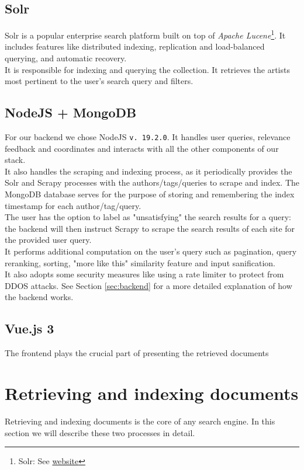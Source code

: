 \documentclass[tikz,14pt]{article}
\begin{document}
\subsection{Solr} \label{sec:solr}
Solr is a popular enterprise search platform built on top of \textit{Apache Lucene}\footnote{Solr: See \href{https://solr.apache.org/guide/solr/9_0/index.html}{website}}. It includes features like distributed indexing, replication and load-balanced querying, and automatic recovery.\\
It is responsible for indexing and querying the collection. It retrieves the artists most pertinent to the user's search query and filters.

\subsection{NodeJS + MongoDB} \label{sec:node-mongo}
For our backend we chose NodeJS \verb|v. 19.2.0|. It handles user queries, relevance feedback and coordinates and interacts with all the other components of our stack.\\
It also handles the scraping and indexing process, as it periodically provides the Solr and Scrapy processes with the authors/tags/queries to scrape and index. The MongoDB database serves for the purpose of storing and remembering the index timestamp for each author/tag/query.\\
The user has the option to label as "unsatisfying" the search results for a query: the backend will then instruct Scrapy to scrape the search results of each site for the provided user query.\\
It performs additional computation on the user's query such as pagination, query reranking, sorting, "more like this" similarity feature and input sanification.\\ It also adopts some security measures like using a rate limiter to protect from DDOS attacks. See Section \ref{sec:backend} for a more detailed explanation of how the backend works.

\subsection{Vue.js 3} \label{sec:vuejs}
The frontend plays the crucial part of presenting the retrieved documents

\section{Retrieving and indexing documents} \label{sec:retrieving}
Retrieving and indexing documents is the core of any search engine. In this section we will describe these two processes in detail.
\end{document}
